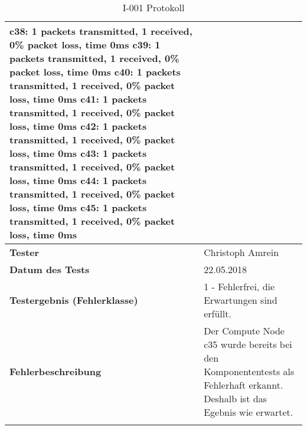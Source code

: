 \begin{longtable}{p{4.5cm}p{11.5cm}}
c38: 1 packets transmitted, 1 received, 0\% packet loss, time 0ms \newline
c39: 1 packets transmitted, 1 received, 0\% packet loss, time 0ms \newline
c40: 1 packets transmitted, 1 received, 0\% packet loss, time 0ms \newline
c41: 1 packets transmitted, 1 received, 0\% packet loss, time 0ms \newline
c42: 1 packets transmitted, 1 received, 0\% packet loss, time 0ms \newline
c43: 1 packets transmitted, 1 received, 0\% packet loss, time 0ms \newline
c44: 1 packets transmitted, 1 received, 0\% packet loss, time 0ms \newline
c45: 1 packets transmitted, 1 received, 0\% packet loss, time 0ms \newline  \\\hline
\cellcolor{heading}\textbf{Tester} & Christoph Amrein  \\\hline
\cellcolor{heading}\textbf{Datum des Tests} & 22.05.2018  \\\hline
\cellcolor{heading}\textbf{Testergebnis \newline (Fehlerklasse)} & 1 - Fehlerfrei, die Erwartungen sind erfüllt. \\\hline
\cellcolor{heading}\textbf{Fehlerbeschreibung} &  Der Compute Node c35 wurde bereits bei den Komponententests als Fehlerhaft erkannt. Deshalb ist das Egebnis wie erwartet. \\\hline
\caption{I-001 Protokoll}
\end{longtable}

